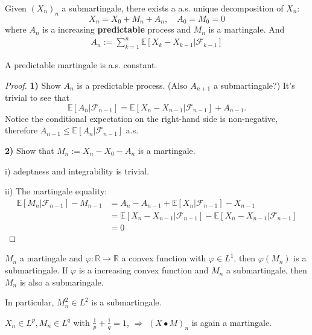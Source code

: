 \begin{theorem}
	Given $(X_n)_n$ a submartingale, there exists a a.s. unique decomposition of $X_n$:
	\begin{equation*}
		X_n = X_0 + M_n + A_n, \quad A_0 = M_0 = 0
	\end{equation*}
	where $A_n$ is a increasing \textbf{predictable} process and $M_n$ is a martingale. And
	\begin{align*}
		A_n := \sum_{k= 1}^n \mathbb{E}[X_k - X_{k-1}|\mathcal{F}_{k-1}]
	\end{align*} 
\end{theorem}
\begin{remark}
A predictable martingale is a.s. constant.	
\end{remark}
\begin{proof}
	\textbf{1)} Show $A_n$ is a predictable process. (Also $A_{n+1}$ a submartingale?) It's trivial to see that
	\[
		\mathbb{E}[A_n|\mathcal{F}_{n-1}] = \mathbb{E}[X_n - X_{n-1}|\mathcal{F}_{n-1}] + A_{n-1}.
	\]
	Notice the conditional expectation on the right-hand side is non-negative, therefore $A_{n-1} \leq  \mathbb{E}[A_n|\mathcal{F}_{n-1}]$ a.s.

	\textbf{2)} Show that $M_n:= X_n - X_0 - A_n$ is a martingale.

	i) adeptness and integrability is trivial.

	ii) The martingale equality:
	\begin{align*}
		\mathbb{E}[M_n | \mathcal{F}_{n-1}] - M_{n-1} &= A_n - A_{n-1} + \mathbb{E}[X_n| \mathcal{F}_{n-1}] - X_{n-1}\\
		&= \mathbb{E}[X_n - X_{n-1}|\mathcal{F}_{n-1}] - \mathbb{E}[X_n - X_{n-1}|\mathcal{F}_{n-1}]\\
		&= 0
	\end{align*}
\end{proof}

\begin{lemma}
	$M_n$ a martingale and $\varphi: \mathbb{R} \rightarrow \mathbb{R}$ a convex function with $\varphi \in L^1$, then $\varphi(M_n)$ is a submartingale. If $\varphi$ is a increasing convex function and $M_n$ a submartingale, then $M_n$ is also a submaringale.
\end{lemma}
\begin{remark}
In particular, $M_n^2 \in L^2$ is a submartingale.
\end{remark}




\begin{lemma}
	$X_n \in L^p, M_n \in L^q$ with $\frac{1}{p} + \frac{1}{q} = 1$, $\Rightarrow$ $(X \bullet M)_n $ is again a martingale.
\end{lemma}



